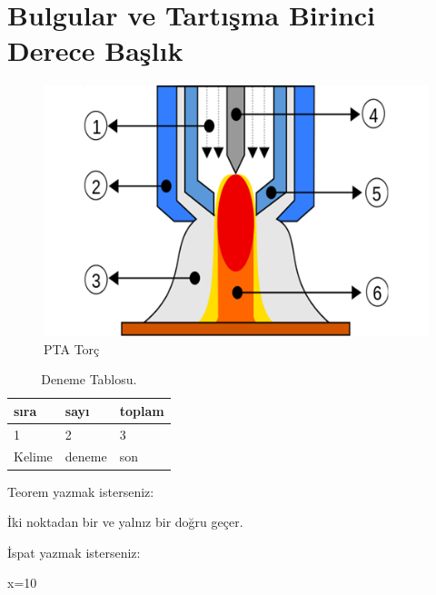 \section{Bulgular ve Tartışma Birinci Derece Başlık}
\lipsum[1-2]
\begin{figure}[h]
\centering
\includegraphics[width=\textwidth]{gorseller/ptaTorc}
\caption{PTA Torç}\label{fig:PtaTorc1}
\end{figure}
\lipsum[1-2]
\begin{table}
\centering
\caption{Deneme Tablosu.}\label{tab:den1}
\begin{tabular}{|l|l|l|}
\hline
sıra   & sayı   & toplam \\ \hline
1      & 2      & 3      \\ \hline
Kelime & deneme & son    \\ \hline
\end{tabular}
\end{table}
Teorem yazmak isterseniz:
\begin{theorem}[Öklid]
 İki noktadan bir ve yalnız bir doğru geçer.
\end{theorem}

İspat yazmak isterseniz:
\begin{ispat}
x=10
\end{ispat}


